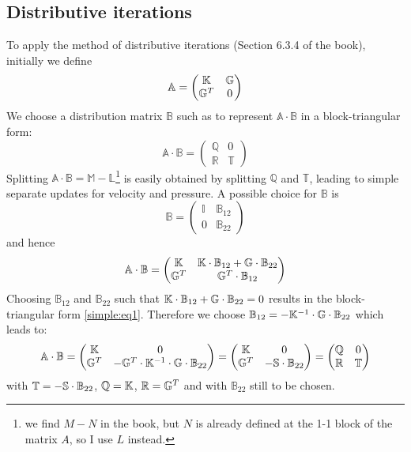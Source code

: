 \subsection*{Distributive iterations}
To apply the method of distributive iterations (Section 6.3.4 of the book), initially we define
\[
\mathbb{A} = \begin{pmatrix}
{\mathbb{K}} & {\mathbb{G}} \\
{\mathbb{G}}^T & 0
\end{pmatrix}
\]
We choose a distribution matrix $\mathbb{B}$ such as to represent 
$\mathbb{A}\cdot \mathbb{B}$ in a block-triangular form:
\begin{equation}
{\mathbb A}\cdot {\mathbb B} = 
\begin{pmatrix}
\mathbb{Q} & 0 \\
\mathbb{R} & \mathbb{T}
\end{pmatrix}
\label{simple:eq1}
\end{equation}
Splitting $\mathbb{A}\cdot \mathbb{B} = \mathbb{M} - \mathbb{L}$\footnote{we find $M-N$ in the book, 
but $N$ is already defined at the 1-1 block of the matrix $A$, so I use $L$ instead.} is easily obtained by splitting $\mathbb{Q}$ and $\mathbb{T}$, 
leading to simple separate updates for velocity and pressure. A possible choice for ${\mathbb B}$ is
\[
{\mathbb B} = 
\begin{pmatrix}
\mathbb{I} & \mathbb{B}_{12} \\
0 &  \mathbb{B}_{22} 
\end{pmatrix}
\]
and hence 
\[
{\mathbb A}\cdot {\mathbb B} = 
\begin{pmatrix}
{\mathbb{K}} & {\mathbb{K}} \cdot \mathbb{B}_{12} + {\mathbb{G}} \cdot \mathbb{B}_{22} \\
{\mathbb{G}}^T & {\mathbb{G}}^T \cdot \mathbb{B}_{12}
\end{pmatrix}
\]
Choosing $\mathbb{B}_{12}$ and $\mathbb{B}_{22}$ such that ${\mathbb{K}} \cdot \mathbb{B}_{12} + {\mathbb{G}} \cdot \mathbb{B}_{22} =0$ results in the block-triangular form \eqref{simple:eq1}.
Therefore we choose
$\mathbb{B}_{12} = - {\mathbb{K}}^{-1} \cdot {\mathbb{G}} \cdot \mathbb{B}_{22} $ which leads to:
\[
{\mathbb A}\cdot {\mathbb B} 
= 
\begin{pmatrix}
{\mathbb{K}} & 0 \\
{\mathbb{G}}^T & - {\mathbb{G}}^T \cdot {\mathbb{K}}^{-1} \cdot {\mathbb{G}} \cdot \mathbb{B}_{22} 
\end{pmatrix}
= 
\begin{pmatrix}
{\mathbb{K}} & 0 \\
{\mathbb{G}}^T & - {\mathbb{S}} \cdot \mathbb{B}_{22} 
\end{pmatrix}
=
\begin{pmatrix}
\mathbb{Q} & 0 \\
\mathbb{R} & \mathbb{T}
\end{pmatrix}
\]
with $\mathbb{T} = - {\mathbb{S}} \cdot \mathbb{B}_{22}$, $\mathbb{Q}={\mathbb{K}}$, $\mathbb{R}={\mathbb{G}}^T$ and with $\mathbb{B}_{22}$ still to be chosen.

